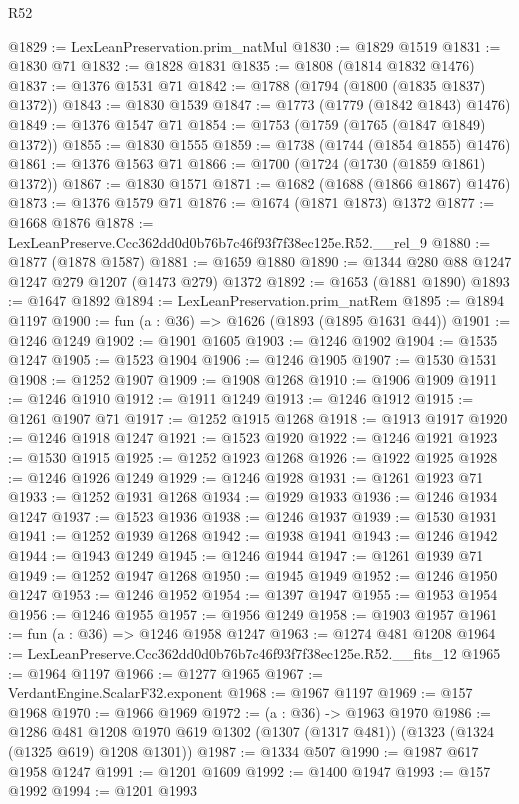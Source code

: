 \begin{lexlean}{R52}
\begin{coremodule}
@1829 := LexLeanPreservation.prim_natMul
@1830 := @1829 @1519
@1831 := @1830 @71
@1832 := @1828 @1831
@1835 := @1808 (@1814 @1832 @1476)
@1837 := @1376 @1531 @71
@1842 := @1788 (@1794 (@1800 (@1835 @1837) @1372))
@1843 := @1830 @1539
@1847 := @1773 (@1779 (@1842 @1843) @1476)
@1849 := @1376 @1547 @71
@1854 := @1753 (@1759 (@1765 (@1847 @1849) @1372))
@1855 := @1830 @1555
@1859 := @1738 (@1744 (@1854 @1855) @1476)
@1861 := @1376 @1563 @71
@1866 := @1700 (@1724 (@1730 (@1859 @1861) @1372))
@1867 := @1830 @1571
@1871 := @1682 (@1688 (@1866 @1867) @1476)
@1873 := @1376 @1579 @71
@1876 := @1674 (@1871 @1873) @1372
@1877 := @1668 @1876
@1878 := LexLeanPreserve.Ccc362dd0d0b76b7c46f93f7f38ec125e.R52.__rel_9
@1880 := @1877 (@1878 @1587)
@1881 := @1659 @1880
@1890 := @1344 @280 @88 @1247 @1247 @279 @1207 (@1473 @279) @1372
@1892 := @1653 (@1881 @1890)
@1893 := @1647 @1892
@1894 := LexLeanPreservation.prim_natRem
@1895 := @1894 @1197
@1900 := fun (a : @36) => @1626 (@1893 (@1895 @1631 @44))
@1901 := @1246 @1249
@1902 := @1901 @1605
@1903 := @1246 @1902
@1904 := @1535 @1247
@1905 := @1523 @1904
@1906 := @1246 @1905
@1907 := @1530 @1531
@1908 := @1252 @1907
@1909 := @1908 @1268
@1910 := @1906 @1909
@1911 := @1246 @1910
@1912 := @1911 @1249
@1913 := @1246 @1912
@1915 := @1261 @1907 @71
@1917 := @1252 @1915 @1268
@1918 := @1913 @1917
@1920 := @1246 @1918 @1247
@1921 := @1523 @1920
@1922 := @1246 @1921
@1923 := @1530 @1915
@1925 := @1252 @1923 @1268
@1926 := @1922 @1925
@1928 := @1246 @1926 @1249
@1929 := @1246 @1928
@1931 := @1261 @1923 @71
@1933 := @1252 @1931 @1268
@1934 := @1929 @1933
@1936 := @1246 @1934 @1247
@1937 := @1523 @1936
@1938 := @1246 @1937
@1939 := @1530 @1931
@1941 := @1252 @1939 @1268
@1942 := @1938 @1941
@1943 := @1246 @1942
@1944 := @1943 @1249
@1945 := @1246 @1944
@1947 := @1261 @1939 @71
@1949 := @1252 @1947 @1268
@1950 := @1945 @1949
@1952 := @1246 @1950 @1247
@1953 := @1246 @1952
@1954 := @1397 @1947
@1955 := @1953 @1954
@1956 := @1246 @1955
@1957 := @1956 @1249
@1958 := @1903 @1957
@1961 := fun (a : @36) => @1246 @1958 @1247
@1963 := @1274 @481 @1208
@1964 := LexLeanPreserve.Ccc362dd0d0b76b7c46f93f7f38ec125e.R52.__fits_12
@1965 := @1964 @1197
@1966 := @1277 @1965
@1967 := VerdantEngine.ScalarF32.exponent
@1968 := @1967 @1197
@1969 := @157 @1968
@1970 := @1966 @1969
@1972 := (a : @36) -> @1963 @1970
@1986 := @1286
    @481
    @1208
    @1970
    @619
    @1302
    (@1307 (@1317 @481))
    (@1323 (@1324 (@1325 @619) @1208 @1301))
@1987 := @1334 @507
@1990 := @1987 @617 @1958 @1247
@1991 := @1201 @1609
@1992 := @1400 @1947
@1993 := @157 @1992
@1994 := @1201 @1993

\end{coremodule}
\end{lexlean}
